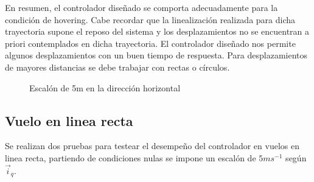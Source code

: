 \documentclass[main]{subfiles}
\begin{document}
En resumen, el controlador diseñado se comporta adecuadamente para la condici\'on de hovering. Cabe recordar que la linealizaci\'on realizada para dicha trayectoria supone el reposo del sistema y los desplazamientos no se encuentran a priori contemplados en dicha trayectoria. El controlador diseñado nos permite algunos desplazamientos con un buen tiempo de respuesta. Para desplazamientos de mayores distancias se debe trabajar con rectas o c\'irculos. 

\begin{figure}[h!]
  \centering
 
  \caption{Escal\'on de 5m en la direcci\'on horizontal}
  \label{fig:hov_esc_x}
\end{figure}

\subsection{Vuelo en linea recta}
Se realizan dos pruebas para testear el desempeño del controlador en vuelos en linea recta, partiendo de condiciones nulas se impone un escal\'on de $5m s ^{-1}$ seg\'un $\vec{i}_q$.
\end{document}
